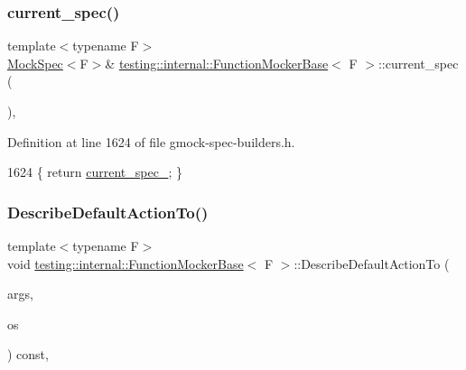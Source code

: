 \subsubsection{\texorpdfstring{current\+\_\+spec()}{current\_spec()}}
{\footnotesize\ttfamily template$<$typename F$>$ \\
\hyperlink{classtesting_1_1internal_1_1MockSpec}{Mock\+Spec}$<$F$>$\& \hyperlink{classtesting_1_1internal_1_1FunctionMockerBase}{testing\+::internal\+::\+Function\+Mocker\+Base}$<$ F $>$\+::current\+\_\+spec (\begin{DoxyParamCaption}{ }\end{DoxyParamCaption})\hspace{0.3cm}{\ttfamily [inline]}, {\ttfamily [protected]}}



Definition at line 1624 of file gmock-\/spec-\/builders.\+h.


\begin{DoxyCode}
1624 \{ \textcolor{keywordflow}{return} \hyperlink{classtesting_1_1internal_1_1FunctionMockerBase_af19843831e9f5eb1c79e8923ac42da92}{current\_spec\_}; \}
\end{DoxyCode}
\mbox{\label{classtesting_1_1internal_1_1FunctionMockerBase_ac9f58631036d0507047e0088b829c237}} 
\subsubsection{\texorpdfstring{Describe\+Default\+Action\+To()}{DescribeDefaultActionTo()}}
{\footnotesize\ttfamily template$<$typename F$>$ \\
void \hyperlink{classtesting_1_1internal_1_1FunctionMockerBase}{testing\+::internal\+::\+Function\+Mocker\+Base}$<$ F $>$\+::Describe\+Default\+Action\+To (\begin{DoxyParamCaption}\item[{const \hyperlink{classtesting_1_1internal_1_1FunctionMockerBase_a336432a07e544af4ffb8103603471ca3}{Argument\+Tuple} \&}]{args,  }\item[{\+::std\+::ostream $\ast$}]{os }\end{DoxyParamCaption}) const\hspace{0.3cm}{\ttfamily [inline]}, {\ttfamily [private]}}



